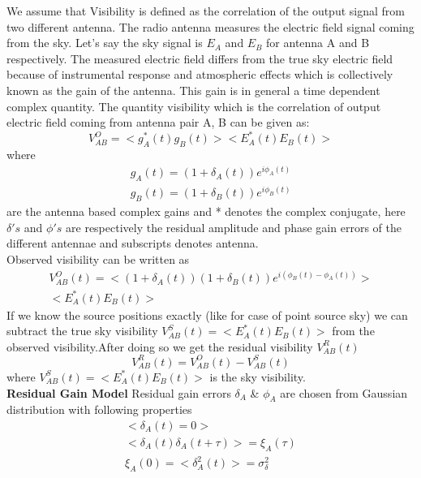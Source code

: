 \documentclass[fleqn,usenatbib]{mnras}
\begin{document}
We assume that 
Visibility is defined as the correlation of the output signal from two different antenna. The radio antenna measures the electric field signal coming from the sky. Let's say the sky signal is $E_A$ and $E_B$ for antenna A and B respectively. The measured electric field differs from the true sky electric field because of instrumental response and atmospheric effects which is collectively known as the gain of the antenna. This gain is in general a time dependent complex quantity. The quantity visibility which is the correlation of output electric field coming from antenna pair A, B can be given as:
\begin{equation}
    V_{AB}^O = <g^*_A(t)g_B(t)> < E^*_A(t)E_B(t)>
\end{equation}
where 
\begin{equation}
    \begin{split}
     g_A(t) = (1+\delta_A(t))e^{i\phi_A(t)} \\ g_B(t) = (1+\delta_B(t))e^{i\phi_B(t)}   
    \end{split}
\end{equation}
 are the antenna based complex gains and * denotes the complex conjugate, here $\delta's$ and $\phi's$ are respectively the residual amplitude and phase gain errors of the different antennae and subscripts denotes antenna.\\
Observed visibility can be written as
\begin{equation}
\begin{split}
    V_{AB}^O(t) = <(1+\delta_A(t))(1+\delta_B(t))e^{i(\phi_B(t)-\phi_A(t))}> \\ < E^*_A(t)E_B(t)>
\end{split}
\end{equation}
If we know the source positions exactly (like for case of point source sky) we can subtract the true sky visibility $V_{AB}^S(t) = <E^*_A(t)E_B(t)> $ from the observed visibility.After doing so we get the residual visibility $V^R_{AB}(t)$
\begin{equation}
    V_{AB}^R (t)= V_{AB}^O(t) - V_{AB}^S(t)
\end{equation}
where $V_{AB}^S(t) =<E^*_A(t)E_B(t)> $ is the sky visibility.\\
\textbf{Residual Gain Model}
Residual gain errors $\delta_A$ \& $\phi_A$ are chosen from Gaussian distribution with following properties
 \begin{equation}
 \begin{split}
     <\delta_A(t) = 0>\\<\delta_A(t) \delta_A(t+\tau)> = \xi_A(\tau)\\\xi_A(0) = <\delta^2_A(t)> = \sigma^2_{\delta}
 \end{split}
 \end{equation}
\end{document}
